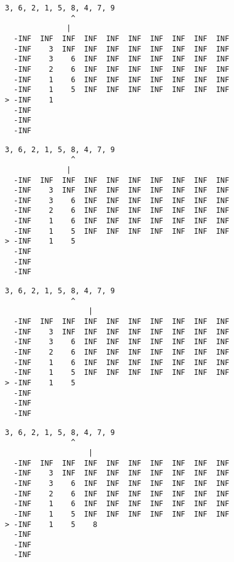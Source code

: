 { \begin{verbatim}
3, 6, 2, 1, 5, 8, 4, 7, 9
               ^
              |
  -INF  INF  INF  INF  INF  INF  INF  INF  INF  INF
  -INF    3  INF  INF  INF  INF  INF  INF  INF  INF
  -INF    3    6  INF  INF  INF  INF  INF  INF  INF
  -INF    2    6  INF  INF  INF  INF  INF  INF  INF
  -INF    1    6  INF  INF  INF  INF  INF  INF  INF
  -INF    1    5  INF  INF  INF  INF  INF  INF  INF
> -INF    1                                        
  -INF                                             
  -INF                                             
  -INF                                             
\end{verbatim} }

{ \begin{verbatim}
3, 6, 2, 1, 5, 8, 4, 7, 9
               ^
              |
  -INF  INF  INF  INF  INF  INF  INF  INF  INF  INF
  -INF    3  INF  INF  INF  INF  INF  INF  INF  INF
  -INF    3    6  INF  INF  INF  INF  INF  INF  INF
  -INF    2    6  INF  INF  INF  INF  INF  INF  INF
  -INF    1    6  INF  INF  INF  INF  INF  INF  INF
  -INF    1    5  INF  INF  INF  INF  INF  INF  INF
> -INF    1    5                                   
  -INF                                             
  -INF                                             
  -INF                                             
\end{verbatim} }

{ \begin{verbatim}
3, 6, 2, 1, 5, 8, 4, 7, 9
               ^
                   |
  -INF  INF  INF  INF  INF  INF  INF  INF  INF  INF
  -INF    3  INF  INF  INF  INF  INF  INF  INF  INF
  -INF    3    6  INF  INF  INF  INF  INF  INF  INF
  -INF    2    6  INF  INF  INF  INF  INF  INF  INF
  -INF    1    6  INF  INF  INF  INF  INF  INF  INF
  -INF    1    5  INF  INF  INF  INF  INF  INF  INF
> -INF    1    5                                   
  -INF                                             
  -INF                                             
  -INF                                             
\end{verbatim} }

{ \begin{verbatim}
3, 6, 2, 1, 5, 8, 4, 7, 9
               ^
                   |
  -INF  INF  INF  INF  INF  INF  INF  INF  INF  INF
  -INF    3  INF  INF  INF  INF  INF  INF  INF  INF
  -INF    3    6  INF  INF  INF  INF  INF  INF  INF
  -INF    2    6  INF  INF  INF  INF  INF  INF  INF
  -INF    1    6  INF  INF  INF  INF  INF  INF  INF
  -INF    1    5  INF  INF  INF  INF  INF  INF  INF
> -INF    1    5    8                              
  -INF                                             
  -INF                                             
  -INF                                             
\end{verbatim} }


